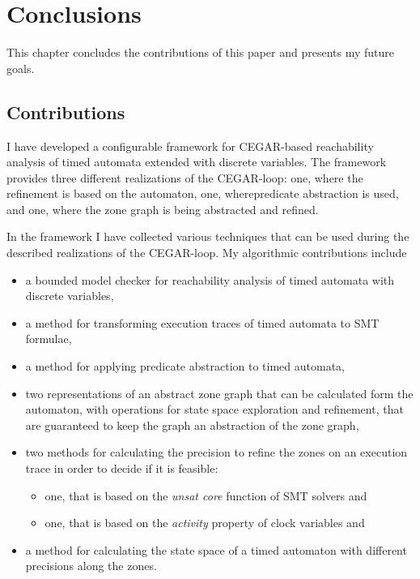 \chapter{Conclusions}\label{chap:concl}

This chapter concludes the contributions of this paper and presents my future goals.

\section{Contributions}

I have developed a configurable framework for CEGAR-based reachability analysis of timed automata extended with discrete variables. The framework provides three different realizations of the CEGAR-loop: one, where the refinement is based on the automaton, one, wherepredicate abstraction is used, and one, where the zone graph is being abstracted and refined.

In the framework I have collected various techniques that can be used during the described realizations of the CEGAR-loop. My algorithmic contributions include
\begin{itemize}
	\item a bounded model checker for reachability analysis of timed automata with discrete variables,
	\item a method for transforming execution traces of timed automata to SMT formulae, %
	\item a method for applying predicate abstraction to timed automata,
	\item two representations of an abstract zone graph that can be calculated form the automaton, with operations for state space exploration and refinement, that are guaranteed to keep the graph an abstraction of the zone graph,
	\item two methods for calculating the precision to refine the zones on an execution trace in order to decide if it is feasible:
	\begin{itemize}
		\item one, that is based on the \emph{unsat core} function of SMT solvers and
		\item one, that is based on the \emph{activity} property of clock variables and
	\end{itemize}
	\item a method for calculating the state space of a timed automaton with different precisions along the zones.
\end{itemize}

